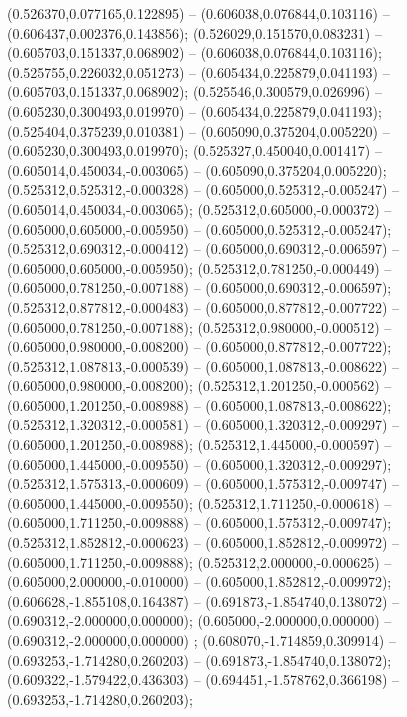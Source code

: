  (0.526370,0.077165,0.122895) -- (0.606038,0.076844,0.103116) -- (0.606437,0.002376,0.143856);
 (0.526029,0.151570,0.083231) -- (0.605703,0.151337,0.068902) -- (0.606038,0.076844,0.103116);
 (0.525755,0.226032,0.051273) -- (0.605434,0.225879,0.041193) -- (0.605703,0.151337,0.068902);
 (0.525546,0.300579,0.026996) -- (0.605230,0.300493,0.019970) -- (0.605434,0.225879,0.041193);
 (0.525404,0.375239,0.010381) -- (0.605090,0.375204,0.005220) -- (0.605230,0.300493,0.019970);
 (0.525327,0.450040,0.001417) -- (0.605014,0.450034,-0.003065) -- (0.605090,0.375204,0.005220);
 (0.525312,0.525312,-0.000328) -- (0.605000,0.525312,-0.005247) -- (0.605014,0.450034,-0.003065);
 (0.525312,0.605000,-0.000372) -- (0.605000,0.605000,-0.005950) -- (0.605000,0.525312,-0.005247);
 (0.525312,0.690312,-0.000412) -- (0.605000,0.690312,-0.006597) -- (0.605000,0.605000,-0.005950);
 (0.525312,0.781250,-0.000449) -- (0.605000,0.781250,-0.007188) -- (0.605000,0.690312,-0.006597);
 (0.525312,0.877812,-0.000483) -- (0.605000,0.877812,-0.007722) -- (0.605000,0.781250,-0.007188);
 (0.525312,0.980000,-0.000512) -- (0.605000,0.980000,-0.008200) -- (0.605000,0.877812,-0.007722);
 (0.525312,1.087813,-0.000539) -- (0.605000,1.087813,-0.008622) -- (0.605000,0.980000,-0.008200);
 (0.525312,1.201250,-0.000562) -- (0.605000,1.201250,-0.008988) -- (0.605000,1.087813,-0.008622);
 (0.525312,1.320312,-0.000581) -- (0.605000,1.320312,-0.009297) -- (0.605000,1.201250,-0.008988);
 (0.525312,1.445000,-0.000597) -- (0.605000,1.445000,-0.009550) -- (0.605000,1.320312,-0.009297);
 (0.525312,1.575313,-0.000609) -- (0.605000,1.575312,-0.009747) -- (0.605000,1.445000,-0.009550);
 (0.525312,1.711250,-0.000618) -- (0.605000,1.711250,-0.009888) -- (0.605000,1.575312,-0.009747);
 (0.525312,1.852812,-0.000623) -- (0.605000,1.852812,-0.009972) -- (0.605000,1.711250,-0.009888);
 (0.525312,2.000000,-0.000625) -- (0.605000,2.000000,-0.010000) -- (0.605000,1.852812,-0.009972);
 (0.606628,-1.855108,0.164387) -- (0.691873,-1.854740,0.138072) -- (0.690312,-2.000000,0.000000);
 (0.605000,-2.000000,0.000000) -- (0.690312,-2.000000,0.000000) ;
 (0.608070,-1.714859,0.309914) -- (0.693253,-1.714280,0.260203) -- (0.691873,-1.854740,0.138072);
 (0.609322,-1.579422,0.436303) -- (0.694451,-1.578762,0.366198) -- (0.693253,-1.714280,0.260203);
